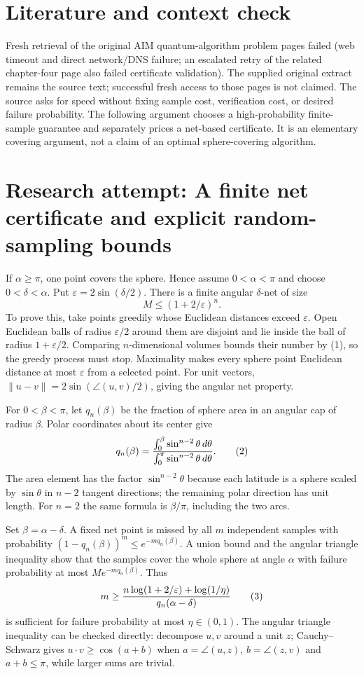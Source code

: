 \documentclass[11pt]{article}
\begin{document}
\section{Literature and context check}
Fresh retrieval of the original AIM quantum-algorithm problem pages failed (web timeout and direct network/DNS failure; an escalated retry of the related chapter-four page also failed certificate validation). The supplied original extract remains the source text; successful fresh access to those pages is not claimed. The source asks for speed without fixing sample cost, verification cost, or desired failure probability. The following argument chooses a high-probability finite-sample guarantee and separately prices a net-based certificate. It is an elementary covering argument, not a claim of an optimal sphere-covering algorithm.
\section{Research attempt: A finite net certificate and explicit random-sampling bounds}
If $\alpha\geq\pi$, one point covers the sphere. Hence assume $0<\alpha<\pi$ and choose $0<\delta<\alpha$. Put $\varepsilon=2\sin(\delta/2)$. There is a finite angular $\delta$-net of size
\[
 M\leq(1+2/\varepsilon)^n.                          \tag{1}
\]
To prove this, take points greedily whose Euclidean distances exceed $\varepsilon$. Open Euclidean balls of radius $\varepsilon/2$ around them are disjoint and lie inside the ball of radius $1+\varepsilon/2$. Comparing $n$-dimensional volumes bounds their number by (1), so the greedy process must stop. Maximality makes every sphere point Euclidean distance at most $\varepsilon$ from a selected point. For unit vectors, $\|u-v\|=2\sin(\angle(u,v)/2)$, giving the angular net property.

For $0<\beta<\pi$, let $q_n(\beta)$ be the fraction of sphere area in an angular cap of radius $\beta$. Polar coordinates about its center give
\[
 q_n(\beta)={\int_0^\beta\sin^{n-2}\theta\,d\theta
                    \over\int_0^\pi\sin^{n-2}\theta\,d\theta}.       \tag{2}
\]
The area element has the factor $\sin^{n-2}\theta$ because each latitude is a sphere scaled by $\sin\theta$ in $n-2$ tangent directions; the remaining polar direction has unit length. For $n=2$ the same formula is $\beta/\pi$, including the two arcs.

Set $\beta=\alpha-\delta$. A fixed net point is missed by all $m$ independent samples with probability $(1-q_n(\beta))^m\leq e^{-m q_n(\beta)}$. A union bound and the angular triangle inequality show that the samples cover the whole sphere at angle $\alpha$ with failure probability at most $M e^{-m q_n(\beta)}$. Thus
\[
 m\geq{n\log(1+2/\varepsilon)+\log(1/\eta)\over q_n(\alpha-\delta)}  \tag{3}
\]
is sufficient for failure probability at most $\eta\in(0,1)$. The angular triangle inequality can be checked directly: decompose $u,v$ around a unit $z$; Cauchy--Schwarz gives $u\cdot v\geq\cos(a+b)$ when $a=\angle(u,z)$, $b=\angle(z,v)$ and $a+b\leq\pi$, while larger sums are trivial.
\end{document}
